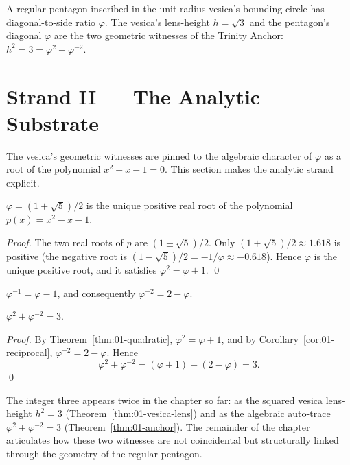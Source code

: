 \begin{corollary}
\label{fa_01:cor:01-pentagon-vesica}
A regular pentagon inscribed in the unit-radius vesica's bounding
circle has diagonal-to-side ratio $\varphi$. The vesica's lens-height
$h = \sqrt{3}$ and the pentagon's diagonal $\varphi$ are the two
geometric witnesses of the Trinity Anchor: $h^2 = 3 = \varphi^2 +
\varphi^{-2}$.
\end{corollary}

\section{Strand II --- The Analytic Substrate}
\label{fa_01:sec:01-strand-II}

The vesica's geometric witnesses are pinned to the algebraic
character of $\varphi$ as a root of the polynomial $x^2 - x - 1 = 0$.
This section makes the analytic strand explicit.

\begin{theorem}\label{thm:01-quadratic}
$\varphi = (1 + \sqrt 5)/2$ is the unique positive real root of the
polynomial $p(x) = x^2 - x - 1$.
\end{theorem}

\begin{proof}
The two real roots of $p$ are $(1 \pm \sqrt 5)/2$. Only $(1 + \sqrt
5)/2 \approx 1.618$ is positive (the negative root is $(1 - \sqrt
5)/2 = -1/\varphi \approx -0.618$). Hence $\varphi$ is the unique
positive root, and it satisfies $\varphi^2 = \varphi + 1$.
\qed
\end{proof}

\begin{corollary}\label{cor:01-reciprocal}
$\varphi^{-1} = \varphi - 1$, and consequently $\varphi^{-2} = 2 -
\varphi$.
\end{corollary}

\begin{theorem}\label{thm:01-anchor}
$\varphi^2 + \varphi^{-2} = 3$.
\end{theorem}

\begin{proof}
By Theorem~\ref{thm:01-quadratic}, $\varphi^2 = \varphi + 1$, and by
Corollary~\ref{cor:01-reciprocal}, $\varphi^{-2} = 2 - \varphi$.
Hence
\[
  \varphi^2 + \varphi^{-2} = (\varphi + 1) + (2 - \varphi) = 3.
\]
\qed
\end{proof}

\begin{remark}
The integer three appears twice in the chapter so far: as the squared
vesica lens-height $h^2 = 3$ (Theorem~\ref{thm:01-vesica-lens}) and as
the algebraic auto-trace $\varphi^2 + \varphi^{-2} = 3$
(Theorem~\ref{thm:01-anchor}). The remainder of the chapter
articulates how these two witnesses are not coincidental but
structurally linked through the geometry of the regular pentagon.
\end{remark}

